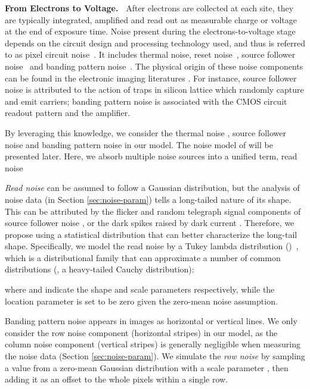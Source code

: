 \documentclass[10pt,twocolumn,letterpaper]{article}
\begin{document}
\vspace{3pt}
\noindent\textbf{From Electrons to Voltage.~}
After electrons are collected at each site, they are typically integrated, amplified
and read out as measurable charge or voltage at the end of exposure time.
Noise present during the electrons-to-voltage stage depends on the circuit design and processing technology used, and thus is referred to as pixel circuit noise~\cite{Gow2007A}. It includes thermal noise, reset noise~\cite{Mikhail2014Highlevel}, source follower noise~\cite{Leyris2005Trap} and banding pattern noise~\cite{Gow2007A}. The physical origin of these noise components can be found in the electronic imaging literatures \cite{Mikhail2014Highlevel,Gow2007A,Wach2004Noise,Leyris2005Trap}. For instance, source follower noise is attributed to the action of traps in silicon lattice which randomly capture and emit carriers; banding pattern noise is associated with the CMOS circuit readout pattern and the amplifier.  

By leveraging this knowledge,  we consider the thermal noise , source follower noise  and banding
pattern noise  in our model.  The noise model of  will be presented later. Here, 
we absorb multiple noise sources
into a
unified term, \ie read noise
\vspace{-1mm}

\textit{Read noise} can be assumed to follow a Gaussian distribution, but the analysis of
noise data (in Section \ref{sec:noise-param}) tells a long-tailed nature of its
shape. This can be attributed by the flicker and random telegraph signal components of source
follower noise \cite{Gow2007A}, or the dark spikes raised by dark current
\cite{Mikhail2014Highlevel}. 
Therefore, we propose using a statistical distribution that can better characterize the long-tail shape.
Specifically, we model the read
noise by a Tukey lambda distribution ()~\cite{Joiner1971Some}, which is a
distributional family that can approximate a number of common distributions (\eg,
a heavy-tailed Cauchy distribution):
\vspace{-1mm}

where  and  indicate the shape and scale parameters
respectively, while the location parameter is set to be zero given the
zero-mean noise assumption.

Banding pattern noise  appears in images as horizontal or vertical lines. We only consider the row noise component (horizontal stripes) in our model, as the column noise component (vertical stripes) is generally negligible
when measuring the noise data (Section \ref{sec:noise-param}). We simulate the
\textit{row noise}  by sampling a value from a zero-mean Gaussian distribution with a scale parameter , then adding it as an offset to the whole pixels within a single row. 
\end{document}
